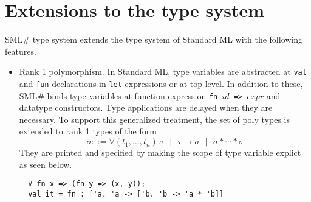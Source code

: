 \documentclass{jbook}
\newif\ifjp
\newcommand{\txt}[2]{#2}
\newcommand{\smlsharp}{SML\#}
\newcommand{\func}{\rightarrow}
\newcommand{\vbar}{\mbox{\ $|$\ }}
\begin{document}
\fi%

\section{\txt{型システムの拡張}{Extensions to the type system}}

\ifjp%
	\smlsharp{}の型システムは，Standard MLの型システムに以下の拡張を
加えたものである．
\else%
	\smlsharp{} type system extends the type system of Standard ML
with the following features.
\fi%

\begin{itemize}
\item 
\ifjp%
	ランク１多相性．
	Standard MLでは，型変数の束縛構文は，{\tt let}式やトップレベルに
現れる{\tt val}宣言や{\tt fun}宣言であるが，\smlsharp{}では，これらに加
え，関数定義式{\tt fn $id$ => $expr$}および多相型を持つデータ型構成子を
含む．
	さらに多相型もつ識別子の型適用は，必要になるまで遅延される．
	この扱いにより，\smlsharp{}の多相型は
\[
\sigma  ::= \forall (t_1,\ldots,t_n).\tau
\vbar \tau \func \sigma 
\vbar \sigma * \cdots * \sigma
\]
の形のランク１多相型に拡張されている．
	このランク１多相型は，
\begin{verbatim}
  # fn x => (fn y => (x, y));
  val it = fn : ['a. 'a -> ['b. 'b -> 'a * 'b]]
\end{verbatim}
のように多相型変数のスコープを明示して表示され，表記される．
\else%
	Rank 1 polymorphism.
	In Standard ML, type variables are abstracted at {\tt val} and
{\tt fun} declarations in {\tt let} expressions or at top level.
	In addition to these,  \smlsharp{} binds type variables at 
function expression {\tt fn $id$ => $expr$} and datatype constructors.
	Type applications are delayed when they are necessary.
	To support this generalized treatment, the set of poly types
is extended to rank 1 types of the form
\[
\sigma  ::= \forall (t_1,\ldots,t_n).\tau
\vbar \tau \func \sigma 
\vbar \sigma * \cdots * \sigma
\]
	They are printed and specified by making the scope of 
type variable explict as seen below.
\begin{verbatim}
  # fn x => (fn y => (x, y));
  val it = fn : ['a. 'a -> ['b. 'b -> 'a * 'b]]
\end{verbatim}
\fi%


\end{itemize}
\end{document}
